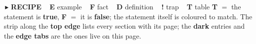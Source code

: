 \noindent\begin{minipage}[b]{\textwidth}
\begingroup
\fontsize{5.6pt}{6.7pt}\selectfont\sffamily
\noindent
{\colorbox{recFrame}{\color{white}\bfseries\,$\blacktriangleright$\,}}\,\textbf{RECIPE}\ \
{\colorbox{exFrame}{\color{white}\bfseries\,E\,}}\,example\ \
{\colorbox{thmFrame}{\color{white}\bfseries\,F\,}}\,fact\ \
{\colorbox{defFrame}{\color{white}\bfseries\,D\,}}\,definition\ \
{\colorbox{trapFrame}{\color{white}\bfseries\,!\,}}\,trap\ \
{\colorbox{tabFrame}{\color{white}\bfseries\,T\,}}\,table
\hfill
\textbf{\color{recFrame}T} $=$ the statement is \textbf{true}, \textbf{\color{trapFrame}F} $=$ it is
\textbf{false}; the statement itself is coloured to match.
\hfill
The strip along the \textbf{top edge} lists every section with its page; the
\textbf{dark} entries and the \textbf{edge tabs} are the ones live on this page.
\par
\endgroup
\vspace{2.5pt}


\end{minipage}
